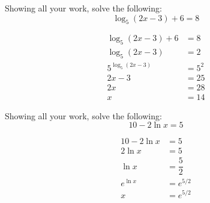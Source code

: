 \documentclass[12pt,letterpaper]{exam}
\begin{document}
\begin{questions}
\newpage
\question[6] Showing all your work, solve the following:
	\[
	\log_5(2x - 3) + 6= 8
	\] \pspace
	
	\[
	\begin{aligned}
	\log_5(2x - 3) + 6&= 8 \\[0.3cm]
	\log_5(2x - 3)&= 2 \\[0.3cm]
	5^{\log_5(2x - 3)}&= 5^2 \\[0.3cm]
	2x - 3&= 25 \\[0.3cm]
	2x&= 28 \\[0.3cm]
	x&= 14
	\end{aligned}
	\]



\newpage
\question[7] Showing all your work, solve the following:
	\[
	10 - 2\ln x= 5
	\] \pspace
	
	\[
	\begin{aligned}
	10 - 2\ln x&= 5 \\[0.3cm]
	2\ln x&= 5 \\
	\ln x&= \dfrac{5}{2} \\[0.3cm]
	e^{\ln x}&= e^{5/2} \\[0.3cm]
	x&= e^{5/2}
	\end{aligned}
	\]


\end{questions}
\end{document}
